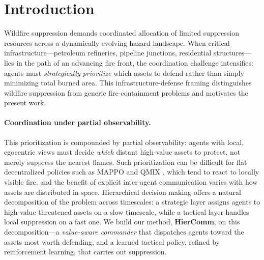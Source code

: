 \documentclass[letterpaper]{article}
\begin{document}
\section{Introduction}
\label{sec:intro}

Wildfire suppression demands coordinated allocation of limited suppression resources across a dynamically evolving hazard landscape. When critical infrastructure---petroleum refineries, pipeline junctions, residential structures---lies in the path of an advancing fire front, the coordination challenge intensifies: agents must \emph{strategically prioritize} which assets to defend rather than simply minimizing total burned area. This infrastructure-defense framing distinguishes wildfire suppression from generic fire-containment problems and motivates the present work.

\paragraph{Coordination under partial observability.}
This prioritization is compounded by partial observability: agents with local, egocentric views must decide \emph{which} distant high-value assets to protect, not merely suppress the nearest flames. Such prioritization can be difficult for flat decentralized policies such as MAPPO \citep{yu2022mappo} and QMIX \citep{rashid2018qmix}, which tend to react to locally visible fire, and the benefit of explicit inter-agent communication varies with how assets are distributed in space. Hierarchical decision making offers a natural decomposition of the problem across timescales: a strategic layer assigns agents to high-value threatened assets on a slow timescale, while a tactical layer handles local suppression on a fast one. We build our method, \textbf{HierComm}, on this decomposition---a \emph{value-aware commander} that dispatches agents toward the assets most worth defending, and a learned tactical policy, refined by reinforcement learning, that carries out suppression.
\end{document}
